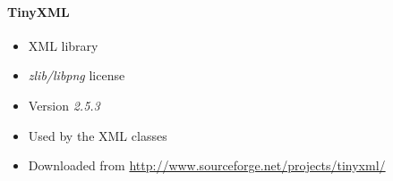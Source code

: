 \paragraph{TinyXML}
\begin{itemize}
\item XML library
\item \emph{zlib/libpng} license
\item Version \emph{2.5.3}
\item Used by the XML classes
\item Downloaded from \url{http://www.sourceforge.net/projects/tinyxml/}
\end{itemize}
